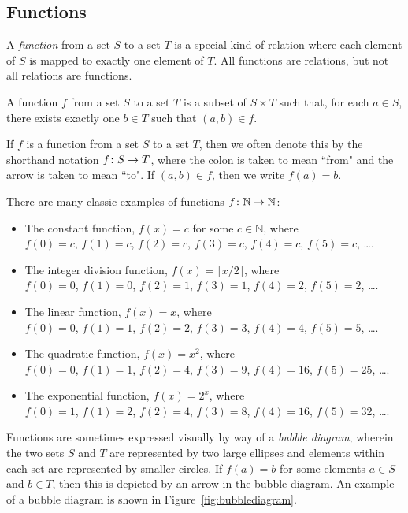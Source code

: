 \subsection*{Functions}

A \emph{function} from a set $S$ to a set $T$ is a special kind of relation where each element of $S$ is mapped to exactly one element of $T$. All functions are relations, but not all relations are functions.

\begin{definition}[Function]
A function $f$ from a set $S$ to a set $T$ is a subset of $S \times T$ such that, for each $a \in S$, there exists exactly one $b \in T$ such that $(a,b) \in f$.
\end{definition}

If $f$ is a function from a set $S$ to a set $T$, then we often denote this by the shorthand notation $f \colon S \to T$, where the colon is taken to mean ``from" and the arrow is taken to mean ``to". If $(a,b) \in f$, then we write $f(a) = b$.

\begin{example}\label{ex:functionexamples}
There are many classic examples of functions $f \colon \mathbb{N} \to \mathbb{N}$:
\begin{itemize}
\item The constant function, $f(x) = c$ for some $c \in \mathbb{N}$, where \\ $f(0) = c$, $f(1) = c$, $f(2) = c$, $f(3) = c$, $f(4) = c$, $f(5) = c$, \dots.
\item The integer division function, $f(x) = \lfloor x/2 \rfloor$, where \\ $f(0) = 0$, $f(1) = 0$, $f(2) = 1$, $f(3) = 1$, $f(4) = 2$, $f(5) = 2$, \dots.
\item The linear function, $f(x) = x$, where \\ $f(0) = 0$, $f(1) = 1$, $f(2) = 2$, $f(3) = 3$, $f(4) = 4$, $f(5) = 5$, \dots.
\item The quadratic function, $f(x) = x^{2}$, where \\ $f(0) = 0$, $f(1) = 1$, $f(2) = 4$, $f(3) = 9$, $f(4) = 16$, $f(5) = 25$, \dots.
\item The exponential function, $f(x) = 2^{x}$, where \\ $f(0) = 1$, $f(1) = 2$, $f(2) = 4$, $f(3) = 8$, $f(4) = 16$, $f(5) = 32$, \dots.
\end{itemize}
\end{example}

Functions are sometimes expressed visually by way of a \emph{bubble diagram}, wherein the two sets $S$ and $T$ are represented by two large ellipses and elements within each set are represented by smaller circles. If $f(a) = b$ for some elements $a \in S$ and $b \in T$, then this is depicted by an arrow in the bubble diagram. An example of a bubble diagram is shown in Figure~\ref{fig:bubblediagram}.

